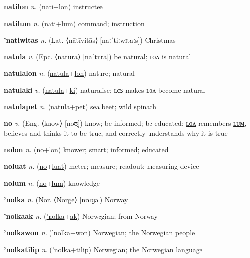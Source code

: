 \textbf{\hypertarget{natilon}{natilon}} \textit{n.} (\hyperlink{nati}{nati}+\allowbreak \hyperlink{lon}{lon})
instructee

\textbf{\hypertarget{natilum}{natilum}} \textit{n.} (\hyperlink{nati}{nati}+\allowbreak \hyperlink{lum}{lum})
command; instruction

\textbf{\hypertarget{'natiwitas}{'natiwitas}} \textit{n.} (Lat. ⟨nātīvitās⟩ [naːˈtiːwɪtaːs])
Christmas

\textbf{\hypertarget{natula}{natula}} \textit{v.} (Epo. ⟨natura⟩ [naˈtura])
be natural; \hyperlink{natulalon}{ʟᴏᴧ} is natural

\textbf{\hypertarget{natulalon}{natulalon}} \textit{n.} (\hyperlink{natula}{natula}+\allowbreak \hyperlink{lon}{lon})
nature; natural

\textbf{\hypertarget{natulaki}{natulaki}} \textit{v.} (\hyperlink{natula}{natula}+\allowbreak \hyperlink{ki}{ki})
naturalise; ʟєꜱ makes ʟᴏᴧ become natural

\textbf{\hypertarget{natulapet}{natulapet}} \textit{n.} (\hyperlink{natula}{natula}+\allowbreak \hyperlink{pet}{pet})
sea beet; wild spinach

\textbf{\hypertarget{no}{no}} \textit{v.} (Eng. ⟨know⟩ [noʊ̯])
know; be informed; be educated; \hyperlink{nolon}{ʟᴏᴧ} remembers \hyperlink{nolum}{ʟᴜᴍ}, believes and thinks it to be true, and correctly understands why it is true

\textbf{\hypertarget{nolon}{nolon}} \textit{n.} (\hyperlink{no}{no}+\allowbreak \hyperlink{lon}{lon})
knower; smart; informed; educated

\textbf{\hypertarget{noluat}{noluat}} \textit{n.} (\hyperlink{no}{no}+\allowbreak \hyperlink{luat}{luat})
meter; measure; readout; measuring device

\textbf{\hypertarget{nolum}{nolum}} \textit{n.} (\hyperlink{no}{no}+\allowbreak \hyperlink{lum}{lum})
knowledge

\textbf{\hypertarget{'nolka}{'nolka}} \textit{n.} (Nor. ⟨Norge⟩ [nʊɾɡə])
Norway

\textbf{\hypertarget{'nolkaak}{'nolkaak}} \textit{n.} (\hyperlink{'nolka}{'nolka}+\allowbreak \hyperlink{ak}{ak})
Norwegian; from Norway

\textbf{\hypertarget{'nolkawon}{'nolkawon}} \textit{n.} (\hyperlink{'nolka}{'nolka}+\allowbreak \hyperlink{won}{won})
Norwegian; the Norwegian people

\textbf{\hypertarget{'nolkatilip}{'nolkatilip}} \textit{n.} (\hyperlink{'nolka}{'nolka}+\allowbreak \hyperlink{tilip}{tilip})
Norwegian; the Norwegian language

